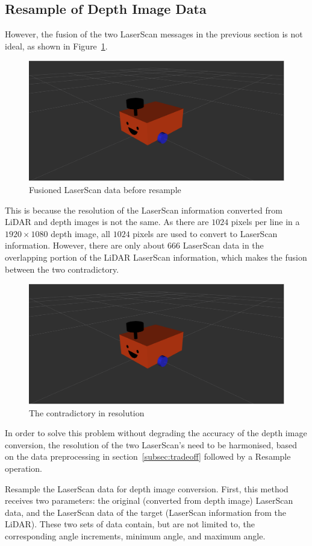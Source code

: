 \subsection{Resample of Depth Image Data}
However, the fusion of the two LaserScan messages in the previous section is not ideal, as shown in Figure~\ref{fig:fusioned}.
\begin{figure}[H]
    \centering
    \includegraphics[width=0.8\linewidth]{figs/robot.png}
    \caption{Fusioned LaserScan data before resample}
    \label{fig:fusioned}
\end{figure}
This is because the resolution of the LaserScan information converted from LiDAR and depth images is not the same. 
As there are $1024$ pixels per line in a $1920\times1080$ depth image, 
all $1024$ pixels are used to convert to LaserScan information. 
However, there are only about 666 LaserScan data in the overlapping portion of the LiDAR LaserScan information, 
which makes the fusion between the two contradictory.
\begin{figure}[H]
    \centering
    \includegraphics[width=0.8\linewidth]{figs/robot.png}
    \caption{The contradictory in resolution}
\end{figure}
In order to solve this problem without degrading the accuracy of the depth image conversion, 
the resolution of the two LaserScan's need to be harmonised,
based on the data preprocessing in section~\ref{subsec:tradeoff} followed by a Resample operation.

Resample the LaserScan data for depth image conversion. 
First, this method receives two parameters: the original (converted from depth image) LaserScan data, 
and the LaserScan data of the target (LaserScan information from the LiDAR). 
These two sets of data contain, but are not limited to, 
the corresponding angle increments, minimum angle, and maximum angle.

